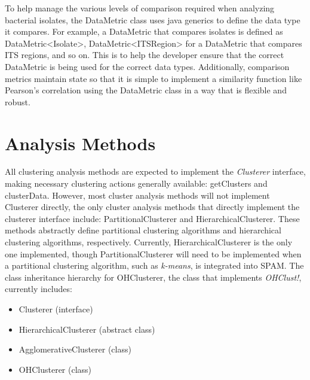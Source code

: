 \documentclass[12pt]{ucthesis}
\begin{document}
      To help manage the various levels of comparison required when analyzing
      bacterial isolates, the DataMetric class uses java generics to
      define the data type it compares. For example, a DataMetric that compares
      isolates is defined as DataMetric<Isolate>, DataMetric<ITSRegion> for a
      DataMetric that compares ITS regions, and so on. This is to help the
      developer ensure that the correct DataMetric is being used for the
      correct data types. Additionally, comparison metrics maintain state so
      that it is simple to implement a similarity function like Pearson's
      correlation using the DataMetric class in a way that is flexible and
      robust.

   \section{Analysis Methods}\label{sec:analysis}
      All clustering analysis methods are expected to implement the
      \textit{Clusterer} interface, making necessary clustering actions
      generally available: \textsf{getClusters} and \textsf{clusterData}.
      However, most cluster analysis methods will not implement Clusterer
      directly, the only cluster analysis methods that directly implement the
      clusterer interface include: PartitionalClusterer and
      HierarchicalClusterer. These methods abstractly define partitional
      clustering algorithms and hierarchical clustering algorithms,
      respectively. Currently, HierarchicalClusterer is the only one
      implemented, though PartitionalClusterer will need to be implemented when
      a partitional clustering algorithm, such as \textit{k-means}, is
      integrated into SPAM. The class inheritance hierarchy for OHClusterer,
      the class that implements \textit{OHClust!}, currently includes:
      \begin{itemize}
         \item Clusterer (interface)
         \item HierarchicalClusterer (abstract class)
         \item AgglomerativeClusterer (class)
         \item OHClusterer (class)
      \end{itemize}
\end{document}
